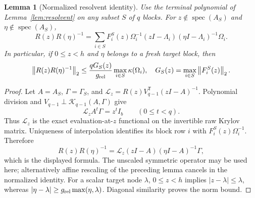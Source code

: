 \documentclass[11pt]{article}
\newtheorem{lemma}[theorem]{Lemma}
\newcommand{\norm}[1]{\left\lVert#1\right\rVert}
\newcommand{\K}{\mathcal K}
\begin{document}
\begin{lemma}[Normalized resolvent identity]\label{lem:relative}
Use the terminal polynomial of Lemma~\ref{lem:resolvent} on any subset
$S$ of $q$ blocks. For $z\notin\operatorname{spec}(A_S)$ and
$\eta\notin\operatorname{spec}(A_S)$,
\[
 R(z)R(\eta)^{-1}
 =\sum_{i\in S}F_i^S(z)\Omega_i^{-1}
       (zI-\Lambda_i)(\eta I-\Lambda_i)^{-1}\Omega_i.
\]
In particular, if $0\leq z<h$ and $\eta$ belongs to a fresh target
block, then
\[
 \norm{R(z)R(\eta)^{-1}}_2
       \leq\frac{qG_S(z)}{g_{\rm rel}}
                              \max_{i\in S}\kappa(\Omega_i),
 \quad G_S(z)=\max_{i\in S}\norm{F_i^S(z)}_2.
\]
\end{lemma}
\begin{proof}
Let $A=A_S$, $\Gamma=\Gamma_S$, and
$\mathcal L_z=R(z)V_{q-1}^{\mathsf T}(zI-A)^{-1}$.
Polynomial division and $V_{q-1}\perp\K_{q-1}(A,\Gamma)$ give
\[
 \mathcal L_z A^t\Gamma=z^t I_b\qquad(0\leq t<q).
\]
Thus $\mathcal L_z$ is the exact evaluation-at-$z$ functional on the
invertible raw Krylov matrix. Uniqueness of interpolation identifies its
block row $i$ with $F_i^S(z)\Omega_i^{-1}$. Therefore
\[
 R(z)R(\eta)^{-1}
   =\mathcal L_z(zI-A)(\eta I-A)^{-1}\Gamma,
\]
which is the displayed formula. The unscaled symmetric operator may be
used here; alternatively affine rescaling of the preceding lemma cancels
in the normalized identity. For a scalar target node $\lambda$,
$0\leq z<h$ implies $|z-\lambda|\leq\lambda$, whereas
$|\eta-\lambda|\geq g_{\rm rel}\max(\eta,\lambda)$.
Diagonal similarity proves the norm bound.
\end{proof}
\end{document}
